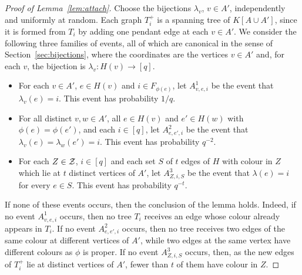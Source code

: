 \begin{proof}[Proof of Lemma~\ref{lem:attach}]
Choose the bijections $\lambda_v$, $v\in A'$, independently and uniformly at random. Each graph $T_i^+$ is a spanning tree of $K[A\cup A']$, since it is formed from $T_i$ by adding one pendant edge at each $v\in A'$.
We consider the following three families of events, all of which are canonical in the sense of Section~\ref{sec:bijections}, where the coordinates are the vertices $v\in A'$ and, for each $v$, the bijection is $\lambda_v:H(v)\to [q]$.
\begin{itemize}
\item For each $v\in A'$, $e\in H(v)$ and $i\in F_{\phi(e)}$, let $A^1_{v,e,i}$ be the event that $\lambda_v(e)=i$. This event has probability $1/q$.
\item For all distinct $v,w\in A'$, all $e\in H(v)$ and $e'\in H(w)$ with $\phi(e)=\phi(e')$, and each $i\in [q]$, let $A^2_{e,e',i}$ be the event that $\lambda_v(e)=\lambda_w(e')=i$. This event has probability $q^{-2}$.
\item For each $Z\in\mathcal{Z}$, $i\in[q]$ and each set $S$ of $t$ edges of $H$ with colour in $Z$ which lie at $t$ distinct vertices of $A'$, let $A^3_{Z,i,S}$ be the event that $\lambda(e)=i$ for every $e\in S$. This event has probability $q^{-t}$.
\end{itemize}
If none of these events occurs, then the conclusion of the lemma holds.
Indeed, if no event $A^1_{v,e,i}$ occurs, then no tree $T_i$ receives an edge whose colour already appears in $T_i$.
If no event $A^2_{e,e',i}$ occurs, then no tree receives two edges of the same colour at different vertices of $A'$, while two edges at the same vertex have different colours as $\phi$ is proper.
If no event $A^3_{Z,i,S}$ occurs, then, as the new edges of $T_i^+$ lie at distinct vertices of $A'$, fewer than $t$ of them have colour in $Z$.


\end{proof}
